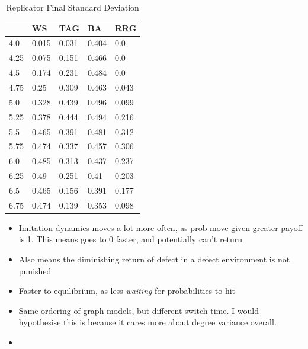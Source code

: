 \begin{table}[]
\begin{tabular}{|l|l|l|l|l|}
\hline
     & WS    & TAG   & BA    & RRG   \\ \hline
4.0  & 0.015 & 0.031 & 0.404 & 0.0   \\ \hline
4.25 & 0.075 & 0.151 & 0.466 & 0.0   \\ \hline
4.5  & 0.174 & 0.231 & 0.484 & 0.0   \\ \hline
4.75 & 0.25  & 0.309 & 0.463 & 0.043 \\ \hline
5.0  & 0.328 & 0.439 & 0.496 & 0.099 \\ \hline
5.25 & 0.378 & 0.444 & 0.494 & 0.216 \\ \hline
5.5  & 0.465 & 0.391 & 0.481 & 0.312 \\ \hline
5.75 & 0.474 & 0.337 & 0.457 & 0.306 \\ \hline
6.0  & 0.485 & 0.313 & 0.437 & 0.237 \\ \hline
6.25 & 0.49  & 0.251 & 0.41  & 0.203 \\ \hline
6.5  & 0.465 & 0.156 & 0.391 & 0.177 \\ \hline
6.75 & 0.474 & 0.139 & 0.353 & 0.098 \\ \hline
\end{tabular}
\caption{Replicator Final Standard Deviation}
\label{tab:Rep_final}
\end{table}
\begin{itemize}
    \item Imitation dynamics moves a lot more often, as prob move given greater payoff is 1. This means goes to 0 faster, and potentially can't return
    \item Also means the diminishing return of defect in a defect environment is not punished
    \item Faster to equilibrium, as less \emph{waiting} for probabilities to hit
    \item Same ordering of graph models, but different switch time. I would hypothesise this is because it cares more about degree variance overall. 
    \item 
\end{itemize}
